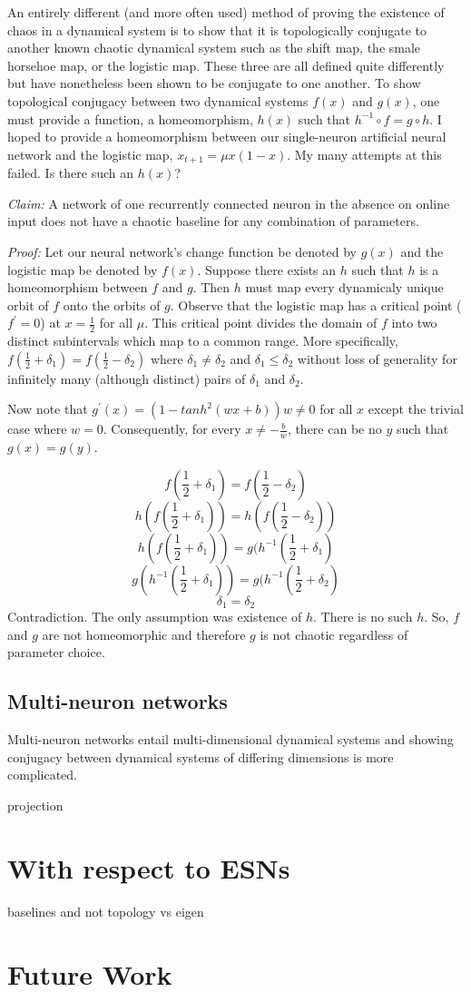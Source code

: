 \documentclass{article}
\begin{document}
An entirely different (and more often used) method of proving the existence
of chaos in a dynamical system is to show that it is topologically conjugate
to another known chaotic dynamical system such as the shift map, the smale horsehoe map,
or the logistic map.
These three are all defined quite differently but have nonetheless been 
shown to be conjugate to one another.  To show topological conjugacy 
between two dynamical systems $f(x)$ and $g(x)$, one must provide a 
function, a homeomorphism, $h(x)$ such that $h^{-1} \circ f = g \circ h$.
I hoped to provide a homeomorphism between our single-neuron artificial 
neural network and the logistic map, $x_{t+1} = \mu x (1-x)$.  My many attempts at this failed.  Is there such an $h(x)$?

\textit{Claim:}  A network of one recurrently connected neuron in the 
absence on online input does not have a chaotic baseline for any 
combination of parameters.

\textit{Proof:}
Let our neural network's change function be denoted by $g(x)$ and the logistic map be denoted by $f(x)$.
Suppose there exists an $h$ such that $h$ is a homeomorphism 
between $f$ and $g$.  Then $h$ must map every dynamicaly unique 
orbit of $f$ onto the orbits of $g$.  Observe that the logistic map has a 
critical point ($f^{\prime} = 0$) at $x=\frac{1}{2}$ for all $\mu$.  This 
critical point divides the domain of $f$ into two distinct subintervals 
which map to a common range.  More 
specifically, $f(\frac{1}{2} + \delta_{1}) = f(\frac{1}{2} - \delta_{2})$ 
where $\delta_{1} \neq \delta_{2}$ and $\delta_{1} \le \delta_{2}$ without loss of generality for infinitely many (although distinct) 
pairs of $\delta_{1}$ and $\delta_{2}$.

Now note that $g^{\prime}(x) = (1 - tanh^{2}(wx+b))w \neq 0$ for all $x$ except the trivial case where $w=0$.  
Consequently, for every $x \neq -\frac{b}{w}$, there can be no $y$ 
such that $g(x) = g(y)$.

$$f(\frac{1}{2} + \delta_{1}) = f(\frac{1}{2} - \delta_{2})$$
$$h(f(\frac{1}{2} + \delta_{1})) = h(f(\frac{1}{2} - \delta_{2}))$$
$$h(f(\frac{1}{2} + \delta_{1})) = g(h^{-1}(\frac{1}{2} + \delta_{1})$$
$$g(h^{-1}(\frac{1}{2} + \delta_{1})) = g(h^{-1}(\frac{1}{2} + \delta_{2})$$
$$\delta_{1} = \delta_{2}$$
Contradiction.  The only assumption was existence of $h$.  There is no such $h$. So, $f$ and $g$ are not homeomorphic and therefore $g$ is not chaotic regardless of parameter choice.


\subsection{Multi-neuron networks}
Multi-neuron networks entail multi-dimensional dynamical systems and showing 
conjugacy between dynamical systems of differing dimensions is more complicated.

projection

\section{With respect to ESNs}
baselines and not
topology vs eigen
\section{Future Work}
\end{document}
